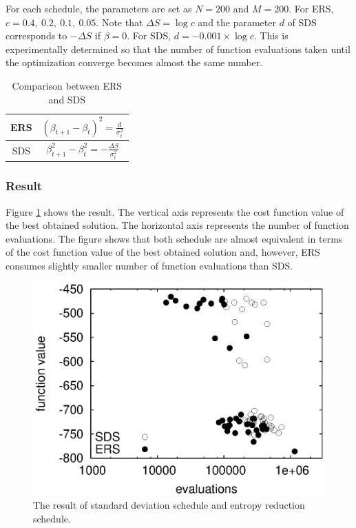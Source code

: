 For each schedule, the parameters are set as
$N=200$ and $M=200$.
For ERS, $c=0.4,~ 0.2,~ 0.1,~ 0.05$.
Note that $\Delta S=\log c$ and the parameter $d$ of SDS corresponds to
$-\Delta S$ if $\beta=0$.
For SDS, $d=-0.001 \times \log c$. 
This is experimentally determined so that
the number of function evaluations taken until the optimization converge
becomes almost the same number.

\begin{table}[tbp]
\renewcommand{\arraystretch}{1.23}
\centering
\caption{Comparison between ERS and SDS}
\large{
\begin{tabular}{|c|c|}
\hline
ERS & $(\beta_{t+1}-\beta_t)^2=\frac{d}{\sigma^2_t} $
\\
\hline
SDS & $\beta_{t+1}^2-\beta_t^2= - \frac{\Delta S}{\sigma_t^2}$ \\
\hline
\end{tabular}
}
\label{table-erssds}
\end{table}


\subsubsection{Result}
Figure \ref{ers_vs_sds_2dising} shows the result.
The vertical axis represents the cost function value of the best
obtained solution.
The horizontal axis represents the number of function evaluations.
The figure shows that
both schedule are almost equivalent in terms of 
the cost function value of the best obtained solution and, however,
ERS consumes slightly smaller number of function evaluations
than SDS.
\begin{figure}
\centerline{\includegraphics[width=\figlength\linewidth]{data_ers/sds_vs_ers_ising2d.eps}}
\caption{The result of  standard deviation schedule and entropy
 reduction schedule.}
\label{ers_vs_sds_2dising}
\end{figure}


